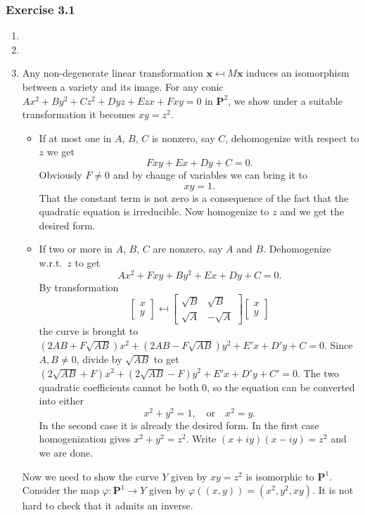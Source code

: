 \documentclass{note}
\newcommand{\Ex}[1]{\subsubsection*{Exercise #1}}
\newcommand{\Proj}[1]{\mathbf{P}^{#1}}
\begin{document}
\Ex{3.1}
\begin{enumerate}
\item
\item
\item Any non-degenerate linear transformation
  $\mathbf{x} \mapsfrom M\mathbf{x}$ induces an isomorphism between a
  variety and its image. For any conic
  $Ax^2 + By^2 + Cz^2 + Dyz + Ezx + Fxy = 0$ in $\Proj{2}$, we show
  under a suitable transformation it becomes $xy = z^2$.
  \begin{itemize}
  \item If at most one in $A$, $B$, $C$ is nonzero, say $C$,
    dehomogenize with respect to $z$ we get
    \begin{equation*}
      Fxy + Ex + Dy + C = 0.
    \end{equation*}
    Obviously $F \ne 0$ and by change of variables we can bring it to
    \begin{equation*}
      xy = 1.
    \end{equation*}
    That the constant term is not zero is a consequence of the fact
    that the quadratic equation is irreducible. Now homogenize to $z$
    and we get the desired form.
  \item If two or more in $A$, $B$, $C$ are nonzero, say $A$ and
    $B$. Dehomogenize w.r.t.~$z$ to get
    \begin{equation*}
      Ax^2 + Fxy + By^2 + Ex + Dy + C = 0.
    \end{equation*}
    By transformation
    \begin{equation*}
      \begin{bmatrix}
        x \\ y
      \end{bmatrix}
      \mapsfrom
      \begin{bmatrix}
        \sqrt{B} & \sqrt{B} \\
        \sqrt{A} & -\sqrt{A}
      \end{bmatrix}
      \begin{bmatrix}
        x \\ y
      \end{bmatrix}
    \end{equation*}
    the curve is brought to
    $(2AB + F\sqrt{AB})x^2 + (2AB - F\sqrt{AB})y^2 + E'x + D'y + C =
    0$. Since $A,B\ne0$, divide by $\sqrt{AB}$ to get
    $(2\sqrt{AB} + F)x^2 + (2\sqrt{AB} - F)y^2 + E'x + D'y + C' =
    0$. The two quadratic coefficients cannot be both 0, so the
    equation can be converted into either
    \begin{equation*}
      x^2 + y^2 = 1, \quad \text{or} \quad x^2 = y.
    \end{equation*}
    In the second case it is already the desired form. In the first
    case homogenization gives $x^2 + y^2 = z^2$. Write
    $(x + iy)(x - iy) = z^2$ and we are done.
  \end{itemize}
  Now we need to show the curve $Y$ given by $xy = z^2$ is isomorphic
  to $\Proj{1}$. Consider the map $\varphi\colon\Proj{1} \to Y$ given
  by $\varphi((x,y)) = (x^2,y^2,xy)$. It is not hard to check that it
  admits an inverse.
  

\end{enumerate}
\end{document}

